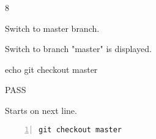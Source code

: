 \begin{description}[align=right,leftmargin=3.2cm,labelindent=3.0cm]
\item[Step:] 8
\item[Confirm:] Switch to master branch.
\item[Expectation:] Switch to branch "master" is displayed.
\item[Command:] echo git  checkout master
\item[Test Result:] PASS
\item[Evidence:] Starts on next line.
\end{description}
\begin{lstlisting}[numbers=left]
git checkout master

\end{lstlisting}
